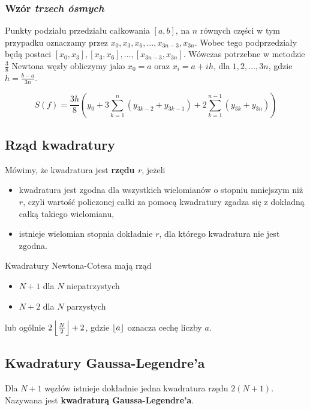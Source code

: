 \documentclass[../mn-notatki.tex]{subfiles}
\begin{document}
\subsubsection{Wzór \textit{trzech ósmych}}

Punkty podziału przedziału całkowania
$[a,b]$,
na $n$ równych części w tym przypadku
oznaczamy przez $x_0, x_3, x_6, \ldots, x_{3n-3}, x_{3n}$.
Wobec tego podprzedziały będą postaci
$[x_0, x_3], [x_3, x_6], \ldots, [x_{3n-3}, x_{3n}]$.
Wówczas potrzebne w metodzie $\frac{3}{8}$ Newtona węzły obliczymy jako
$x_0 = a$ oraz $x_i = a + ih$, dla $1, 2, \ldots, 3n$, gdzie
$h = \frac{b-a}{3n}$.

\begin{tcolorbox}
\[
S(f) = \frac{3h}{8}
\left(
y_0
+ 3 \sum_{k=1}^n (y_{3k-2} + y_{3k-1})
+ 2 \sum_{k=1}^{n-1} (y_{3k} + y_{3n})
\right)
\]
\end{tcolorbox}


\subsection{Rząd kwadratury}

\begin{tcolorbox}
Mówimy, że kwadratura jest \textbf{rzędu $r$}, jeżeli
\begin{itemize}
    \item kwadratura jest zgodna dla wszystkich wielomianów o stopniu mniejszym
    niż $r$, czyli wartość policzonej całki za pomocą kwadratury zgadza się
    z dokładną całką takiego wielomianu,
    \item istnieje wielomian stopnia dokładnie $r$, dla którego kwadratura nie
    jest zgodna.
\end{itemize}
\end{tcolorbox}

Kwadratury Newtona-Cotesa mają rząd
\begin{itemize}
    \item $N+1$ dla $N$ niepatrzystych
    \item $N+2$ dla $N$ parzystych
\end{itemize}
lub ogólnie $2 \left \lfloor \frac{N}{2} \right \rfloor + 2$, gdzie $\left \lfloor a \right \rfloor$ oznacza cechę liczby
$a$.

\subsection{Kwadratury Gaussa-Legendre'a}

\begin{tcolorbox}
Dla $N+1$ węzłów istnieje dokładnie jedna kwadratura rzędu $2(N+1)$.
Nazywana jest \textbf{kwadraturą Gaussa-Legendre'a}.
\end{tcolorbox}
\end{document}
